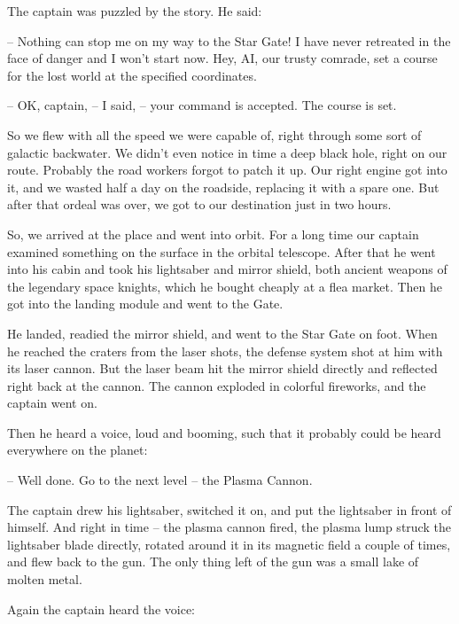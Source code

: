 \documentclass[ebook,twoside,final,openright]{memoir}
\begin{document}
\par
The captain was puzzled by the story. He said:\par
– Nothing can stop me on my way to the Star Gate! I have never retreated in the face of danger and I won’t start now. Hey, AI, our trusty comrade, set a course for the lost world at the specified coordinates.\par
– OK, captain, – I said, – your command is accepted. The course is set.\par
So we flew with all the speed we were capable of, right through some sort of galactic backwater. We didn’t even notice in time a deep black hole, right on our route. Probably the road workers forgot to patch it up. Our right engine got into it, and we wasted half a day on the roadside, replacing it with a spare one. But after that ordeal was over, we got to our destination just in two hours.\par
\par
So, we arrived at the place and went into orbit. For a long time our captain examined something on the surface in the orbital telescope. After that he went into his cabin and took his lightsaber and mirror shield, both ancient weapons of the legendary space knights, which he bought cheaply at a flea market. Then he got into the landing module and went to the Gate.\par
\par
He landed, readied the mirror shield, and went to the Star Gate on foot. When he reached the craters from the laser shots, the defense system shot at him with its laser cannon. But the laser beam hit the mirror shield directly and reflected right back at the cannon. The cannon exploded in colorful fireworks, and the captain went on.\par
\par
Then he heard a voice, loud and booming, such that it probably could be heard everywhere on the planet:\par
– Well done. Go to the next level – the Plasma Cannon.\par
The captain drew his lightsaber, switched it on, and put the lightsaber in front of himself. And right in time – the plasma cannon fired, the plasma lump struck the lightsaber blade directly, rotated around it in its magnetic field a couple of times, and flew back to the gun. The only thing left of the gun was a small lake of molten metal.\par
\par
Again the captain heard the voice:\par
\end{document}
